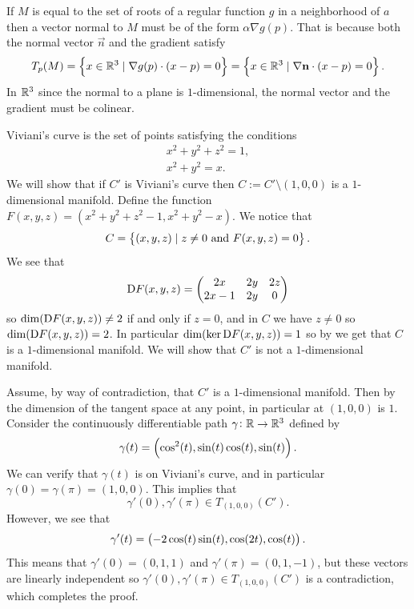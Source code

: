 \documentclass[11pt,a4paper]{article}
\begin{document}
\begin{remark}
  If $M$ is equal to the set of roots of a regular function $g$
  in a neighborhood of $a$ then a vector normal to $M$ must be 
  of the form $\alpha \nabla g(p)$. 
  That is because both the normal vector $\vec n$ and the gradient satisfy
  \[
    T_p(M) =
    \left\{x \in \mathbb{R}^3 \mid \nabla g(p) \cdot (x - p) = 0\right\} =
    \left\{x \in \mathbb{R}^3 \mid \nabla \boldsymbol{\mathbf{n}} \cdot (x - p) = 0\right\}.
  \]
  In $\mathbb{R}^3$ since the normal to a plane is $1$-dimensional, the normal
  vector and the gradient must be colinear.
\end{remark}

\begin{example}
  Viviani's curve is the set of points satisfying the conditions
  \begin{gather*}
    x^2 + y^2 + z^2 = 1, \\
    x^2 + y^2 = x.
  \end{gather*}
  We will show that if $C'$ is Viviani's curve then $C := C' \setminus (1,0,0)$
  is a $1$-dimensional manifold.
  Define the function $F(x,y,z) = (x^2 + y^2 + z^2 - 1, x^2 + y^2 - x)$.
  We notice that
  \[
    C = \left\{(x,y,z) \mid z \neq 0 \text{ and } F(x,y,z) = 0\right\}.
  \]
  We see that
  \[
    \mathrm{D} F(x,y,z) =
    \begin{pmatrix}
      2x & 2y & 2z \\
      2x - 1 & 2y & 0
    \end{pmatrix}
  \]
  so $\dim(\mathrm{D} F(x,y,z)) \neq 2$ if and only if $z = 0$,
  and in $C$ we have $z \neq 0$ so $\dim(\mathrm{D} F(x,y,z)) = 2$.
  In particular $\dim(\ker \mathrm{D} F(x,y,z)) = 1$ so
  by  we get that $C$ is a $1$-dimensional
  manifold.
  We will show that $C'$ is not a $1$-dimensional manifold.

  Assume, by way of contradiction, that $C'$ is a $1$-dimensional
  manifold.
  Then by 
  the dimension of the tangent space at any point,
  in particular at $(1,0,0)$ is $1$.
  Consider the continuously differentiable path $\gamma \colon \mathbb{R} \to \mathbb{R}^3$
  defined by
  \[
    \gamma(t) = \del{\cos^{2}(t), \sin(t) \cos(t), \sin(t)}.
  \]
  We can verify that $\gamma(t)$ is on Viviani's curve,
  and in particular $\gamma(0) = \gamma(\pi) = (1,0,0)$.
  This implies that
  \[
    \gamma'(0),\gamma'(\pi) \in T_{(1,0,0)}(C').
  \]
  However, we see that
  \[
    \gamma'(t) = \del{-2\cos(t) \sin(t), \cos(2t), \cos(t)}.
  \]
  This means that $\gamma'(0) = (0,1,1)$ and $\gamma'(\pi) = (0,1,-1)$,
  but these vectors are linearly independent so
  $\gamma'(0),\gamma'(\pi) \in T_{(1,0,0)}(C')$
  is a contradiction, which completes the proof.
\end{example}
\end{document}
